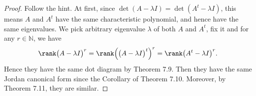 \begin{Exercise}
	\begin{proof}
		Follow the hint. 
		At first, since $\det(A-\lambda I) = \det(A^t - \lambda I)$, this means $A$ and $A^t$ have the same characteristic polynomial, and hence have the same eigenvalues. 
		We pick arbitrary eigenvalue $\lambda$ of both $A$ and $A^t$, fix it and for any $r\in\mathbb{N}$, we have
		$$
		\rank\big(A-\lambda I\big)^r 
		= \rank\Big(\big(A-\lambda I\big)^t\Big)^r
		= \rank\big(A^t - \lambda I\big)^r.
		$$
		Hence they have the same dot diagram by Theorem 7.9. 
		Then they have the same Jordan canonical form since the Corollary of Theorem 7.10. 
		Moreover, by Theorem 7.11, they are similar.
	\end{proof}
\end{Exercise}